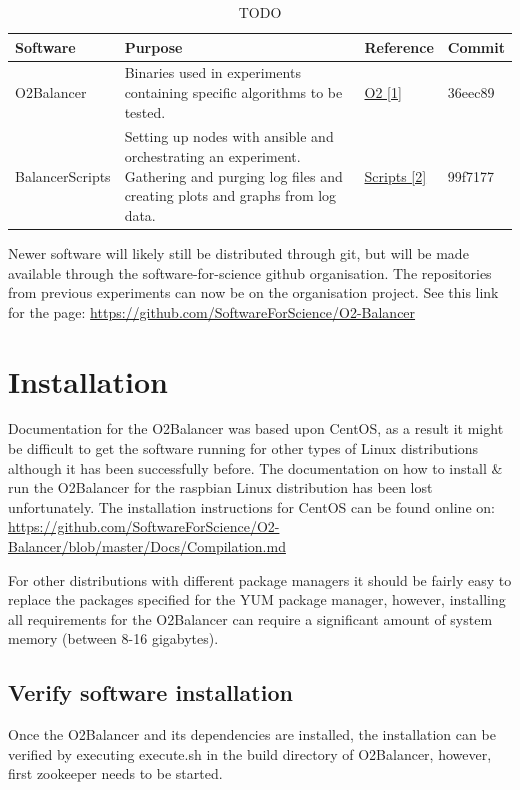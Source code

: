\documentclass[]{article}
\begin{document}
\begin{table}[H]
	\begin{center}	
		\begin{tabularx}{\textwidth}{ | l | X | l | l | }
			\hline
			\textbf{Software} & \textbf{Purpose} & \textbf{Reference} & \textbf{Commit} \\ \hline
			
			O2Balancer & Binaries used in experiments containing specific algorithms to be tested. & \hyperref[sec:ref01]{O2 [1]} & 36eec89 \\ \hline
			
			BalancerScripts & Setting up nodes with ansible and orchestrating an experiment. Gathering and purging log files and creating plots and graphs from log data. & \hyperref[sec:ref02]{Scripts [2]} & 99f7177 \\ \hline
		\end{tabularx}
		\caption{TODO}
		\label{tab:specs}
	\end{center}
\end{table}

Newer software will likely still be distributed through git, but will be made available through the software-for-science github organisation. The repositories from previous experiments can now be on the organisation project. See this link for the page: \url{https://github.com/SoftwareForScience/O2-Balancer}


\section{Installation}
Documentation for the O2Balancer was based upon CentOS, as a result it might be difficult to get the software running for other types of Linux distributions although it has been successfully before. The documentation on how to install \& run the O2Balancer for the raspbian Linux distribution has been lost unfortunately. The installation instructions for CentOS can be found online on: \url{https://github.com/SoftwareForScience/O2-Balancer/blob/master/Docs/Compilation.md}

For other distributions with different package managers it should be fairly easy to replace the packages specified for the YUM package manager, however, installing all requirements for the O2Balancer can require a significant amount of system memory (between 8-16 gigabytes).

\subsection{Verify software installation}
Once the O2Balancer and its dependencies are installed, the installation can be verified by executing execute.sh in the build directory of O2Balancer, however, first zookeeper needs to be started.
\end{document}
